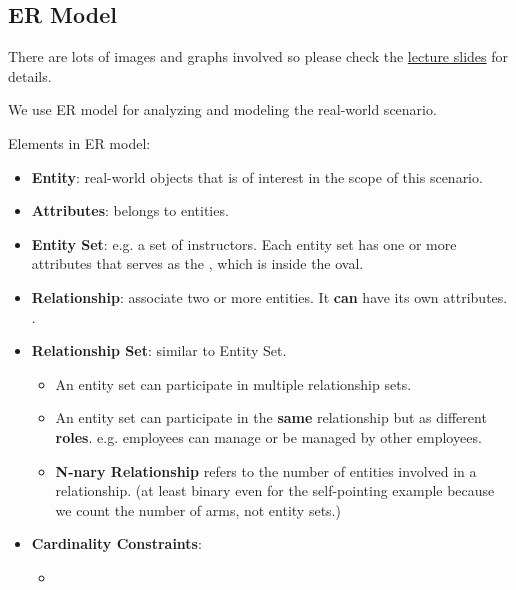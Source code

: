 \documentclass{ainote}
\begin{document}
\subsection{ER Model}
\begin{supp}
    There are lots of images and graphs involved so please check the \href{https://purdue.brightspace.com/d2l/le/content/832018/viewContent/14053416/View}{lecture slides} for details.
\end{supp}

We use ER model for analyzing and modeling the real-world scenario.

Elements in ER model:
\begin{itemize}
    \item \textbf{Entity}: real-world objects that is of interest in the scope of this scenario. 
    \item \textbf{Attributes}: belongs to entities. 
    \item \hlyellow{$\star$} \textbf{Entity Set}:  e.g. a set of instructors. Each entity set has one or more attributes that serves as the , which is  inside the oval. 
    \item \textbf{Relationship}: associate two or more entities. It \textbf{can} have its own attributes. .
    \item \textbf{Relationship Set}: similar to Entity Set.
    \begin{itemize}
        \item An entity set can participate in multiple relationship sets.
        \item An entity set can participate in the \textbf{same} relationship but as different \textbf{roles}. e.g. employees can manage or be managed by other employees.
        \item \textbf{N-nary Relationship} refers to the number of entities involved in a relationship. (at least binary even for the self-pointing example because we count the number of arms, not entity sets.)
    \end{itemize}
    \item \textbf{Cardinality Constraints}: 
    \begin{itemize}
        \item {}

\end{itemize}
\end{itemize}
\end{document}
